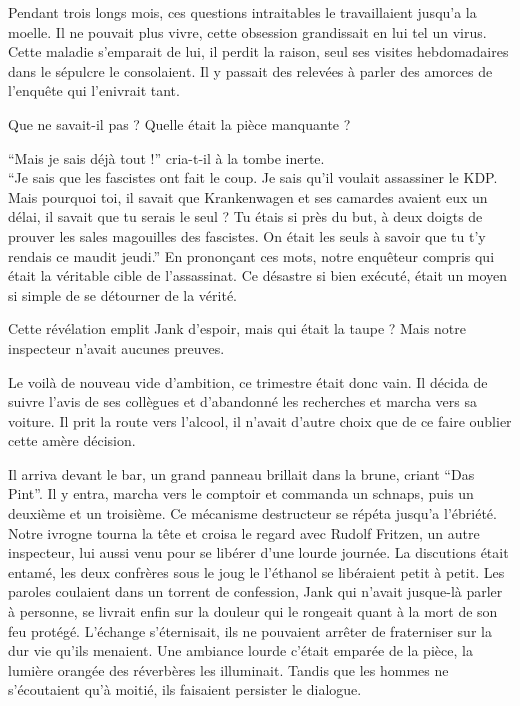 Pendant trois longs mois, ces questions intraitables le travaillaient jusqu'a la moelle.
Il ne pouvait plus vivre, cette obsession grandissait en lui tel un virus.
Cette maladie s'emparait de lui, il perdit la raison, seul ses visites hebdomadaires dans le sépulcre le consolaient.
Il y passait des relevées à parler des amorces de l'enquête qui l'enivrait tant.

Que ne savait-il pas ? Quelle était la pièce manquante ?

\enquote{Mais je sais déjà tout !} cria-t-il à la tombe inerte.\\
\enquote{Je sais que les fascistes ont fait le coup. Je sais qu'il voulait assassiner le KDP.
Mais pourquoi toi, il savait que Krankenwagen et ses camardes avaient eux un délai, il savait que tu serais le seul ?
Tu étais si près du but, à deux doigts de prouver les sales magouilles des fascistes.
On était les seuls à savoir que tu t'y rendais ce maudit jeudi.} En prononçant ces mots, notre enquêteur compris qui était la véritable cible de l'assassinat.
Ce désastre si bien exécuté, était un moyen si simple de se détourner de la vérité.

Cette révélation emplit Jank d'espoir, mais qui était la taupe ? Mais notre inspecteur n'avait aucunes preuves. 

Le voilà de nouveau vide d'ambition, ce trimestre était donc vain. 
Il décida de suivre l'avis de ses collègues et d'abandonné les recherches et marcha vers sa voiture.
Il prit la route vers l'alcool, il n'avait d'autre choix que de ce faire oublier cette amère décision.

Il arriva devant le bar, un grand panneau brillait dans la brune, criant \enquote{{\tgothfamily Das Pint}}.
Il y entra, marcha vers le comptoir et commanda un schnaps, puis un deuxième et un troisième.
Ce mécanisme destructeur se répéta jusqu'a l'ébriété. 
Notre ivrogne tourna la tête et croisa le regard avec Rudolf Fritzen, un autre inspecteur, lui aussi venu pour se libérer d'une lourde journée.
La discutions était entamé, les deux confrères sous le joug le l'éthanol se libéraient petit à petit. 
Les paroles coulaient dans un torrent de confession, Jank qui n'avait jusque-là parler à personne, se livrait enfin 
sur la douleur qui le rongeait quant à la mort de son feu protégé.
L'échange s'éternisait, ils ne pouvaient arrêter de fraterniser sur la dur vie qu'ils menaient.
Une ambiance lourde c'était emparée de la pièce, la lumière orangée des réverbères les illuminait. 
Tandis que les hommes ne s'écoutaient qu'à moitié, ils faisaient persister le dialogue.


